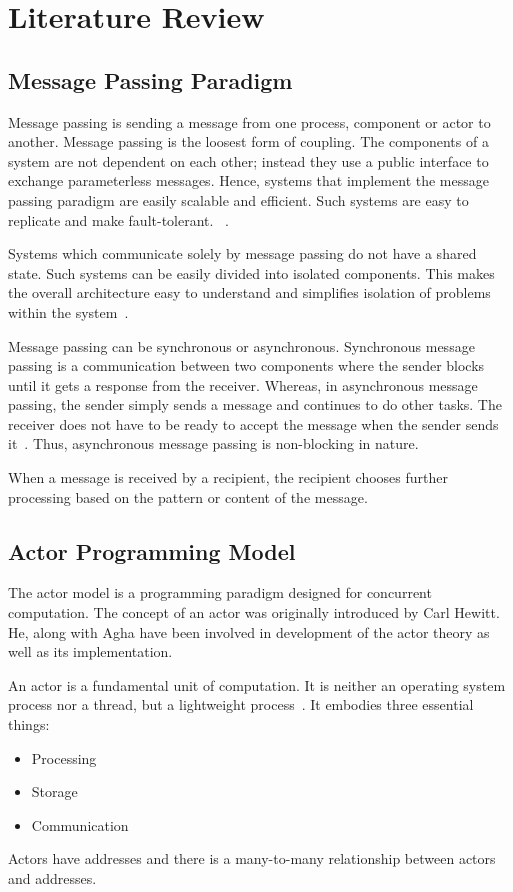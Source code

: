 \chapter{Literature Review}\label{chapter:literature_review}

\section{Message Passing Paradigm}
\label{sec:messagePassing}
  Message passing is sending a message from one process, component or actor to another. Message passing is the loosest form of coupling. The components of a system are not dependent on each other; instead they use a public interface to exchange parameterless messages\cite{joecelko}. Hence, systems that implement the message passing paradigm are easily scalable and efficient. Such systems are easy to replicate and make fault-tolerant.
~\cite{Armstrong:2010:ERL:1810891.1810910}.

  Systems which communicate solely by message passing do not have a shared state. Such systems can be easily divided into isolated components. This makes the overall architecture easy to understand and simplifies isolation of problems within the system~\cite{Armstrong:2010:ERL:1810891.1810910}.

  Message passing can be synchronous or asynchronous. Synchronous message passing is a communication between two components where the sender blocks until it gets a response from the receiver. Whereas, in asynchronous message passing, the sender simply sends a message and continues to do other tasks. The receiver does not have to be ready to accept the message when the sender sends it~\cite{agha}. Thus, asynchronous message passing is non-blocking in nature.

  When a message is received by a recipient, the recipient chooses further processing based on the pattern or content of the message.

\section{Actor Programming Model}
\label{sec:actorProgramming}
  The actor model is a programming paradigm designed for concurrent computation. The concept of an actor was originally introduced by Carl Hewitt\cite{hewitt}. He, along with Agha\cite{agha} have been involved in development of the actor theory as well as its implementation.

  An actor is a fundamental unit of computation. It is neither an operating system process nor a thread, but a lightweight process~\cite{hewittVideo}. %
  It embodies three essential things:
\begin{itemize}
  \item Processing
  \item Storage
  \item Communication
\end{itemize}
  Actors have addresses and there is a many-to-many relationship between actors and addresses.

